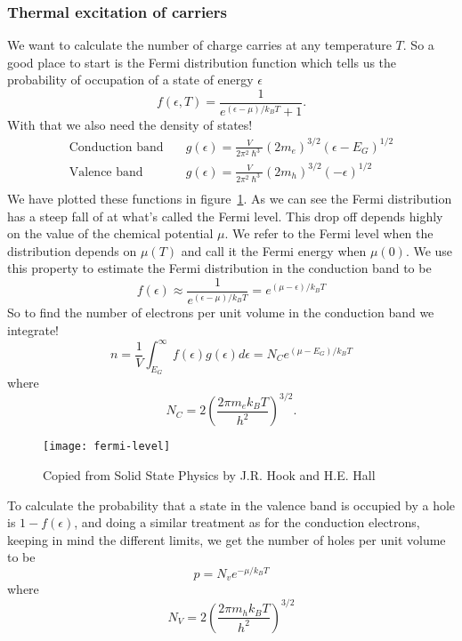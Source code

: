 \documentclass[11pt]{article}
\begin{document}
\subsubsection{Thermal excitation of carriers}
We want to calculate the number of charge carries at any temperature $T$. So a good place to start is the Fermi distribution function which tells us the probability of occupation of a state of energy $\epsilon$
\begin{equation}
f(\epsilon, T) = \frac{1}{e^{(\epsilon - \mu)/k_B T} + 1}.
\end{equation}
With that we also need the density of states!
\begin{align}
	\text{Conduction band} \quad & g(\epsilon) = \frac{V}{2\pi^2 \hslash^3} (2m_e)^{3/2}(\epsilon - E_G)^{1/2} \\
	\text{Valence band} \quad &g(\epsilon) = \frac{V}{2\pi^2 \hslash^3} (2m_h)^{3/2}(-\epsilon)^{1/2} \\
\end{align}
We have plotted these functions in figure~\ref{fig:fermi-level}. As we can see the Fermi distribution has a steep fall of at what's called the Fermi level. This drop off depends highly on the value of the chemical potential $\mu$. We refer to the Fermi level when the distribution depends on $\mu(T)$ and call it the Fermi energy when $\mu(0)$. We use this property to estimate the Fermi distribution in the conduction band to be
\begin{equation}
	f(\epsilon) \approx \frac{1}{e^{(\epsilon-\mu)/k_B T}} = e^{(\mu - \epsilon)/k_B T}
\end{equation}
So to find the number of electrons per unit volume in the conduction band we integrate!
\begin{equation}
	n = \frac{1}{V} \int^\infty_{E_G} f(\epsilon)g(\epsilon) d \epsilon = N_C e^{(\mu - E_G)/k_B T}
	\label{eq:concentration-electrons}
\end{equation}
where 
\begin{equation}
	N_C = 2(\frac{2\pi m_e k_B T}{h^2})^{3/2}.
\end{equation}
\begin{figure}[!ht]
	\centering
	\texttt{[image: fermi-level]}
	\caption{Copied from Solid State Physics by J.R. Hook and H.E. Hall}
	\label{fig:fermi-level}
\end{figure}

To calculate the probability that a state in the valence band is occupied by a hole is $1-f(\epsilon)$, and doing a similar treatment as for the conduction electrons, keeping in mind the different limits, we get the number of holes per unit volume to be
\begin{equation}
	p = N_v e^{-\mu/k_B T}
	\label{eq:concentration-holes}
\end{equation}
where
\begin{equation}
	N_V = 2(\frac{2\pi m_h k_B T}{h^2})^{3/2}
\end{equation}
\end{document}
